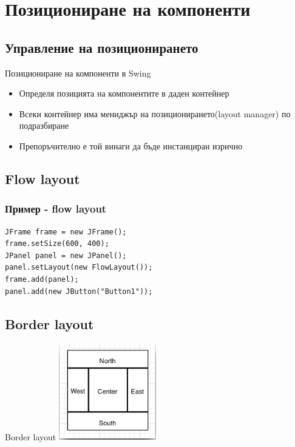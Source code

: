 \documentclass{beamer}
\begin{document}
\section{Позициониране на компоненти}
\subsection{Управление на позиционирането}
\begin{frame}{Позициониране на компоненти в Swing}
  \transdissolve
  \begin{itemize}
  \item Определя позицията на компонентите в даден контейнер
  \item Всеки контейнер има мениджър на позиционирането(layout
    manager) по подразбиране
  \item Препоръчително е той винаги да бъде инстанциран изрично
  \end{itemize}
\end{frame}

\subsection{Flow layout}
\begin{frame}[fragile]
  \frametitle{Пример - flow layout}
  \transdissolve
\begin{lstlisting}
JFrame frame = new JFrame();
frame.setSize(600, 400);
JPanel panel = new JPanel();
panel.setLayout(new FlowLayout());
frame.add(panel);
panel.add(new JButton("Button1"));
\end{lstlisting}
\end{frame}

\subsection{Border layout}
\begin{frame}{Border layout}
  \transdissolve
  \includegraphics[width=160px,height=160px]{images/border_layout.png}
\end{frame}
\end{document}
